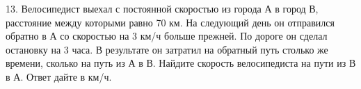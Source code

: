 13. Велосипедист выехал с постоянной скоростью из города А в город В, расстояние между которыми равно 70 км. На следующий день он отправился обратно в А со скоростью на 3 км/ч больше прежней. По дороге он сделал остановку на 3 часа. В результате он затратил на обратный путь столько же времени, сколько на путь из А в В. Найдите скорость велосипедиста на пути из В в А. Ответ дайте в км/ч.\\
